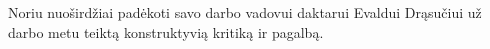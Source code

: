 
\sectionnonumnocontent{}
\addtocounter{page}{1}
\vspace{7cm}
\begin{center}
    Noriu nuoširdžiai padėkoti savo darbo vadovui daktarui Evaldui Drąsučiui už darbo metu teiktą konstruktyvią kritiką ir pagalbą.
\end{center}